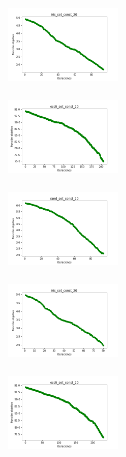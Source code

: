 \newpage

\begin{figure}[H]
    \centering
    \begin{subfigure}
        \centering
        \includegraphics[width=0.32\textwidth]{img/bl/iris_set_const_20_949004259_cost.png}
    \end{subfigure}
    \hfill
    \begin{subfigure}
        \centering
        \includegraphics[width=0.32\textwidth]{img/bl/ecoli_set_const_20_949004259_cost.png}
    \end{subfigure}
    \hfill
    \begin{subfigure}
        \centering
        \includegraphics[width=0.32\textwidth]{img/bl/rand_set_const_20_949004259_cost.png}
    \end{subfigure}
    \hfill
    \begin{subfigure}
        \centering
        \includegraphics[width=0.32\textwidth]{img/bl/iris_set_const_20_589741062_cost.png}
    \end{subfigure}
    \hfill
    \begin{subfigure}
        \centering
        \includegraphics[width=0.32\textwidth]{img/bl/ecoli_set_const_20_589741062_cost.png}

\end{subfigure}
\end{figure}
